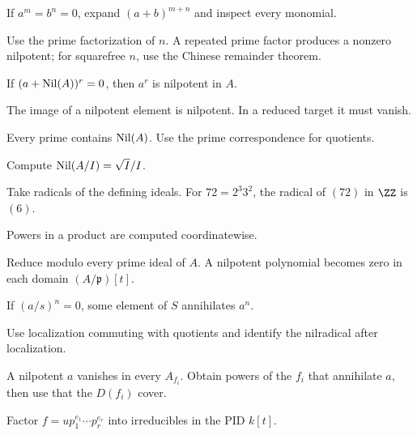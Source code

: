 \begin{hint}
If $a^m=b^n=0$, expand $(a+b)^{m+n}$ and inspect every monomial.
\end{hint}
\begin{hint}
Use the prime factorization of $n$.  A repeated prime factor produces a nonzero nilpotent;
for squarefree $n$, use the Chinese remainder theorem.
\end{hint}
\begin{hint}
If $(a+\operatorname{Nil}(A))^r=0$, then $a^r$ is nilpotent in $A$.
\end{hint}
\begin{hint}
The image of a nilpotent element is nilpotent.  In a reduced target it must vanish.
\end{hint}
\begin{hint}
Every prime contains $\operatorname{Nil}(A)$.  Use the prime correspondence for quotients.
\end{hint}
\begin{hint}
Compute $\operatorname{Nil}(A/I)=\sqrt I/I$.
\end{hint}
\begin{hint}
Take radicals of the defining ideals.  For $72=2^3 3^2$, the radical of $(72)$ in $\ZZ$
is $(6)$.
\end{hint}
\begin{hint}
Powers in a product are computed coordinatewise.
\end{hint}
\begin{hint}
Reduce modulo every prime ideal of $A$.  A nilpotent polynomial becomes zero in each domain
$(A/\mathfrak p)[t]$.
\end{hint}
\begin{hint}
If $(a/s)^n=0$, some element of $S$ annihilates $a^n$.
\end{hint}
\begin{hint}
Use localization commuting with quotients and identify the nilradical after localization.
\end{hint}
\begin{hint}
A nilpotent $a$ vanishes in every $A_{f_i}$.  Obtain powers of the $f_i$ that annihilate
$a$, then use that the $D(f_i)$ cover.
\end{hint}
\begin{hint}
Factor $f=up_1^{e_1}\cdots p_r^{e_r}$ into irreducibles in the PID $k[t]$.
\end{hint}
